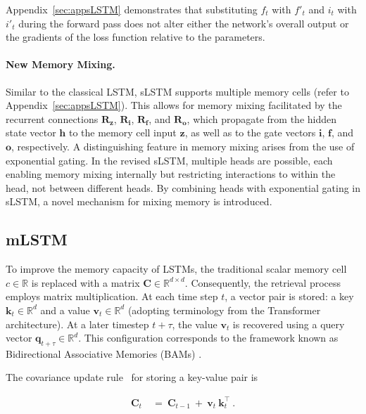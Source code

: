 Appendix~\ref{sec:appsLSTM} demonstrates that substituting $f_t$ with $f'_t$ and $i_t$ with $i'_t$ during the forward pass does not alter either the network's overall output or the gradients of the loss function relative to the parameters.

\paragraph{New Memory Mixing.} Similar to the classical LSTM, sLSTM supports multiple memory cells (refer to Appendix~\ref{sec:appsLSTM}). This allows for memory mixing facilitated by the recurrent connections $\mathbf{R}_{\mathbf{z}}$, $\mathbf{R}_{\mathbf{i}}$, $\mathbf{R}_{\mathbf{f}}$, and $\mathbf{R}_{\mathbf{o}}$, which propagate from the hidden state vector $\mathbf{h}$ to the memory cell input $\mathbf{z}$, as well as to the gate vectors $\mathbf{i}$, $\mathbf{f}$, and $\mathbf{o}$, respectively. A distinguishing feature in memory mixing arises from the use of exponential gating. In the revised sLSTM, multiple heads are possible, each enabling memory mixing internally but restricting interactions to within the head, not between different heads. By combining heads with exponential gating in sLSTM, a novel mechanism for mixing memory is introduced.

\subsection{mLSTM}
\label{sec:mLSTM}

To improve the memory capacity of LSTMs, the traditional scalar memory cell $c \in \mathbb{R}$ is replaced with a matrix $\mathbf{C} \in \mathbb{R}^{d \times d}$. Consequently, the retrieval process employs matrix multiplication. At each time step $t$, a vector pair is stored: a key $\mathbf{k}_t \in \mathbb{R}^d$ and a value $\mathbf{v}_t \in \mathbb{R}^d$ (adopting terminology from the Transformer architecture). At a later timestep $t+\tau$, the value $\mathbf{v}_t$ is recovered using a query vector $\mathbf{q}_{t+\tau} \in \mathbb{R}^d$. This configuration corresponds to the framework known as Bidirectional Associative Memories (BAMs) \citep{Kohonen:72,Anderson:72,Nakano:72,Anderson:77}.

The covariance update rule~\citep{Sejnowski:77,Dayan:91} for storing a key-value pair is

\begin{align}
\mathbf{C}_t \ &= \ \mathbf{C}_{t-1} \ + \ \mathbf{v}_{t} \ \mathbf{k}_t^\top \ .
\end{align}

